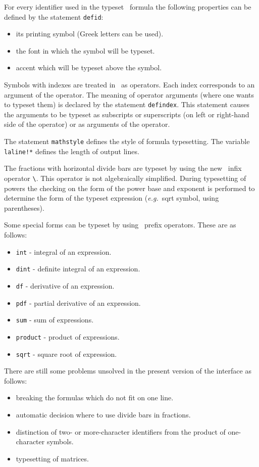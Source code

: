 For every  identifier  used  in  the  typeset  \REDUCE\  formula
the following properties can be defined by the statement {\tt defid}:
\begin{itemize}
\item its printing symbol (Greek letters can be used).
\item the font in which the symbol will be typeset.
\item accent which will be typeset above the symbol.
\end{itemize}

Symbols with indexes are treated in \REDUCE\ as operators.  Each index
corresponds to an argument of the operator.  The meaning of operator
arguments (where one wants to typeset them) is declared by the
statement
{\tt defindex}.  This statement causes the arguments to be typeset as
subscripts or superscripts (on left or right-hand side of the operator)
or as arguments of the operator.

The statement {\tt mathstyle} defines the style of
formula typesetting.  The variable {\tt laline!*}
defines the length of output lines.

The fractions with horizontal divide bars are typeset by using the
new \REDUCE\ infix operator \verb+\+.  This operator is not
algebraically simplified.  During typesetting of powers the checking on
the form of the power base and exponent is performed to determine the
form of the typeset expression ({\em e.g.\ }sqrt symbol, using parentheses).

Some special forms can be typeset by using \REDUCE\ prefix operators.
These are as follows:
\begin{itemize}
\item {\tt int} - integral of an expression.
\item {\tt dint} - definite integral of an expression.
\item {\tt df} - derivative of an expression.
\item {\tt pdf} - partial derivative of an expression.
\item {\tt sum} - sum of expressions.
\item {\tt product} - product of expressions.
\item {\tt sqrt} - square root of expression.
\end{itemize}
There are still some problems unsolved in the present version of the
interface as follows:
\begin{itemize}
\item breaking the formulas which do not fit on one line.
\item automatic decision where to use divide bars in fractions.
\item distinction of two- or more-character identifiers from the product
  of one-character symbols.
\item typesetting of matrices.
\end{itemize}

